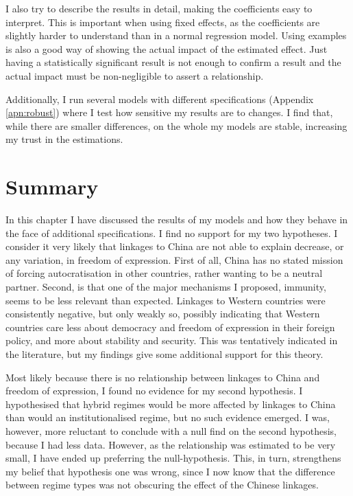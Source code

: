 I also try to describe the results in detail, making the coefficients easy to interpret. This is important when using fixed effects, as the coefficients are slightly harder to understand than in a normal regression model. Using examples is also a good way of showing the actual impact of the estimated effect. Just having a statistically significant result is not enough to confirm a result and the actual impact must be non-negligible to assert a relationship. 

Additionally, I run several models with different specifications (Appendix \ref{apn:robust}) where I test how sensitive my results are to changes. I find that, while there are smaller differences, on the whole my models are stable, increasing my trust in the estimations. 

\section{Summary}
In this chapter I have discussed the results of my models and how they behave in the face of additional specifications. I find no support for my two hypotheses. I consider it very likely that linkages to China are not able to explain decrease, or any variation, in freedom of expression. First of all, China has no stated mission of forcing autocratisation in other countries, rather wanting to be a neutral partner. Second, is that one of the major mechanisms I proposed, immunity, seems to be less relevant than expected. Linkages to Western countries were consistently negative, but only weakly so, possibly indicating that Western countries care less about democracy and freedom of expression in their foreign policy, and more about stability and security. This was tentatively indicated in the literature, but my findings give some additional support for this theory.

Most likely because there is no relationship between linkages to China and freedom of expression, I found no evidence for my second hypothesis. I hypothesised that hybrid regimes would be more affected by linkages to China than would an institutionalised regime, but no such evidence emerged. I was, however, more reluctant to conclude with a null find on the second hypothesis, because I had less data. However, as the relationship was estimated to be very small, I have ended up preferring the null-hypothesis. This, in turn, strengthens my belief that hypothesis one was wrong, since I now know that the difference between regime types was not obscuring the effect of the Chinese linkages.